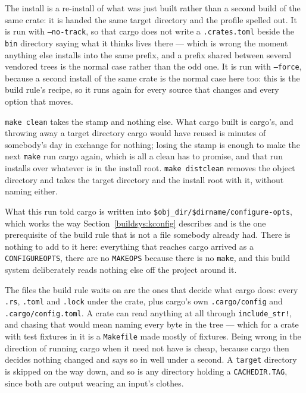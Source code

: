 \documentclass{article}
\begin{document}
The install is a re-install of what was just built rather than a
second build of the same crate: it is handed the same target directory
and the profile spelled out.  It is run with \texttt{--no-track}, so
that cargo does not write a \texttt{.crates.toml} beside the
\texttt{bin} directory saying what it thinks lives there --- which is
wrong the moment anything else installs into the same prefix, and a
prefix shared between several vendored trees is the normal case rather
than the odd one.  It is run with \texttt{--force}, because a second
install of the same crate is the normal case here too: this is the
build rule's recipe, so it runs again for every source that changes
and every option that moves.

\texttt{make clean} takes the stamp and nothing else.  What cargo
built is cargo's, and throwing away a target directory cargo would
have reused is minutes of somebody's day in exchange for nothing;
losing the stamp is enough to make the next \texttt{make} run cargo
again, which is all a clean has to promise, and that run installs over
whatever is in the install root.  \texttt{make distclean} removes the
object directory and takes the target directory and the install root
with it, without naming either.

What this run told cargo is written into
\texttt{\$obj\_dir/\$dirname/configure-opts}, which works the way
Section~\ref{buildsys:kconfig} describes and is the one prerequisite
of the build rule that is not a file somebody already had.  There is
nothing to add to it here: everything that reaches cargo arrived as a
\texttt{CONFIGUREOPTS}, there are no \texttt{MAKEOPS} because there is
no \texttt{make}, and this build system deliberately reads nothing
else off the project around it.

The files the build rule waits on are the ones that decide what cargo
does: every \texttt{.rs}, \texttt{.toml} and \texttt{.lock} under the
crate, plus cargo's own \texttt{.cargo/config} and
\texttt{.cargo/config.toml}.  A crate can read anything at all through
\texttt{include\_str!}, and chasing that would mean naming every byte
in the tree --- which for a crate with test fixtures in it is a
\texttt{Makefile} made mostly of fixtures.  Being wrong in the
direction of running cargo when it need not have is cheap, because
cargo then decides nothing changed and says so in well under a second.
A \texttt{target} directory is skipped on the way down, and so is any
directory holding a \texttt{CACHEDIR.TAG}, since both are output
wearing an input's clothes.
\end{document}
